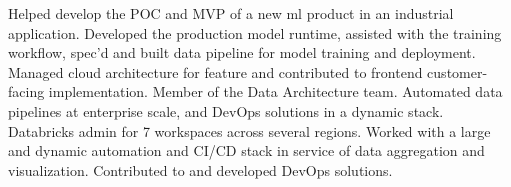 \documentclass[
  a4paper, 
]{FormatDetails}
\begin{document}
\begin{cvtable}
    {Helped develop the POC and MVP of a new ml product in an industrial application. Developed the production model runtime, assisted with the training workflow, spec'd and built data pipeline for model training and deployment. Managed cloud architecture for feature and contributed to frontend customer-facing implementation.}
    \vspace{2mm}
    {Member of the Data Architecture team. Automated data pipelines at enterprise scale, and DevOps solutions in a dynamic stack. Databricks admin for 7 workspaces across several regions.}
    \vspace{2mm}
    {Worked with a large and dynamic automation and CI/CD stack in service of data aggregation and visualization. Contributed to and developed DevOps solutions.}

\end{cvtable}
\end{document}
